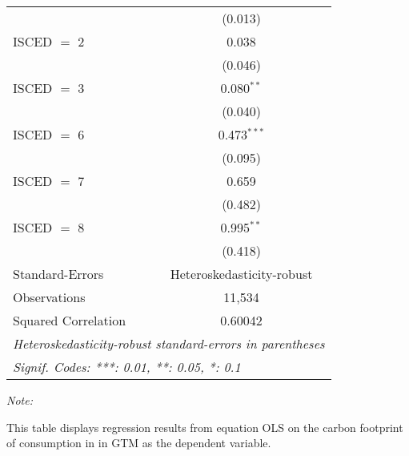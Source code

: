 \begin{table}[htbp!]
\begin{adjustbox}{width = 1\textwidth, max height = 0.95\textheight, center}
\begin{threeparttable}[b]
\begin{tabular}{lc}
                                & (0.013)\\   
            ISCED $=$ 2         & 0.038\\   
                                & (0.046)\\   
            ISCED $=$ 3         & 0.080$^{**}$\\   
                                & (0.040)\\   
            ISCED $=$ 6         & 0.473$^{***}$\\   
                                & (0.095)\\   
            ISCED $=$ 7         & 0.659\\   
                                & (0.482)\\   
            ISCED $=$ 8         & 0.995$^{**}$\\   
                                & (0.418)\\   
            \midrule 
            Standard-Errors     & Heteroskedasticity-robust \\   
            Observations        & 11,534\\  
            Squared Correlation & 0.60042\\  
            \midrule \midrule
            \multicolumn{2}{l}{\emph{Heteroskedasticity-robust standard-errors in parentheses}}\\
            \multicolumn{2}{l}{\emph{Signif. Codes: ***: 0.01, **: 0.05, *: 0.1}}\\
         \end{tabular}
         
         \begin{tablenotes}\item \medskip \textit{Note:}
            \item This table displays regression results from equation OLS on the carbon footprint of consumption in  in GTM as the dependent variable.  
         \end{tablenotes}
      \end{threeparttable}
   \end{adjustbox}
\end{table}


